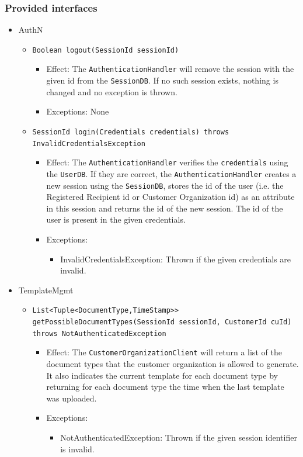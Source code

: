 \documentclass[a4paper,10pt]{article}
\begin{document}
\subsubsection*{Provided interfaces}
\begin{itemize}
    \item AuthN
    \begin{itemize}
           \item \texttt{Boolean logout(SessionId sessionId)}
        \begin{itemize}
            \item Effect: The \texttt{AuthenticationHandler} will remove the session with the given id from the \texttt{SessionDB}. If no such session exists, nothing is changed and no exception is thrown.
            \item Exceptions: None
        \end{itemize}
        
        \item \texttt{SessionId login(Credentials credentials) throws InvalidCredentialsException}
        \begin{itemize}
            \item Effect: The \texttt{AuthenticationHandler} verifies the \texttt{credentials} using the \texttt{UserDB}. If they are correct, the \texttt{AuthenticationHandler} creates a new session using the \texttt{SessionDB}, stores the id of the user (i.e. the Registered Recipient id or Customer Organization id) as an attribute in this session and returns the id of the new session. The id of the user is present in the given credentials.
            \item Exceptions: 
            \begin{itemize}
                \item InvalidCredentialsException: Thrown if the given credentials are invalid.
             \end{itemize}
        \end{itemize}
     \end{itemize}  
      
    \item TemplateMgmt
    \begin{itemize}
    	\item \texttt{List<Tuple<DocumentType,TimeStamp>> getPossibleDocumentTypes(SessionId sessionId, CustomerId cuId) throws NotAuthenticatedException}
        \begin{itemize}
            \item Effect: The \texttt{CustomerOrganizationClient} will return a list of the document types that the customer organization is allowed to generate. It also indicates the current template for each document type by returning for each document type the time when the last template was uploaded.
            \item Exceptions:
            \begin{itemize}
            	\item NotAuthenticatedException: Thrown if the given session identifier is invalid.
            \end{itemize}
        \end{itemize}
        

\end{itemize}
\end{itemize}
\end{document}
